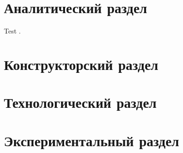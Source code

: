 \chapter{Аналитический раздел}

Test \cite{test}.

\chapter{Конструкторский раздел}

\chapter{Технологический раздел}

\chapter{Экспериментальный раздел}
